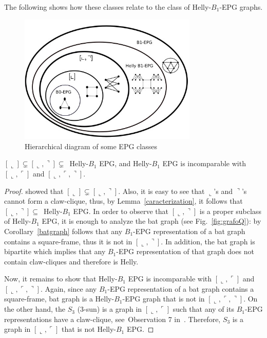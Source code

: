The following shows how these classes relate to the class of Helly-$B_1$-EPG graphs.

%
\begin{figure}[H]	
\center%
\includegraphics[width=8.5cm]{./img/classes} %
\caption{Hierarchical diagram of some EPG classes}
\label{fig:diagramaEPG}
\end{figure}

\begin{theorem}\label{theo:HellyLShaped}
$[\llcorner]\subsetneq [\llcorner, \urcorner]\subsetneq$~Helly-$B_1$ EPG, and Helly-$B_1$ EPG is incomparable with $[\llcorner, \ulcorner]$ and $[\llcorner, \ulcorner, \urcorner]$.
\end{theorem}
\begin{proof}
\cite{cameron2016edge} showed that $[\llcorner]\subsetneq [\llcorner, \urcorner]$. Also, it is easy to see that $\llcorner$’s and $\urcorner$’s cannot form a claw-clique, thus, by Lemma~\ref{caracterization}, it follows that $[\llcorner, \urcorner]\subseteq$~Helly-$B_1$ EPG. In order to observe that $[\llcorner, \urcorner]$ is a proper subclass of Helly-$B_1$ EPG, it is enough to analyze the bat graph (see Fig.~\ref{fig:grafoQ}): by Corollary~\ref{batgraph} follows that any $B_1$-EPG representation of a bat graph contains a square-frame, thus it is not in $[\llcorner, \urcorner]$. In addition, the bat graph is bipartite which implies that any $B_1$-EPG representation of that graph does not contain claw-cliques and therefore is Helly.

Now, it remains to show that Helly-$B_1$ EPG is incomparable with $[\llcorner, \ulcorner]$ and $[\llcorner, \ulcorner, \urcorner]$. Again, since any $B_1$-EPG representation of a bat graph contains a square-frame, bat graph is a Helly-$B_1$-EPG graph that is not in $[\llcorner, \ulcorner, \urcorner]$. On the other hand, the $S_3$ (3-sun) is a graph in $[\llcorner, \ulcorner]$ such that any of its $B_1$-EPG representations have a claw-clique, see~Observation 7 in~\cite{cameron2016edge}. Therefore, $S_3$ is a graph in $[\llcorner, \ulcorner]$ that is not Helly-$B_1$ EPG.
\end{proof}

